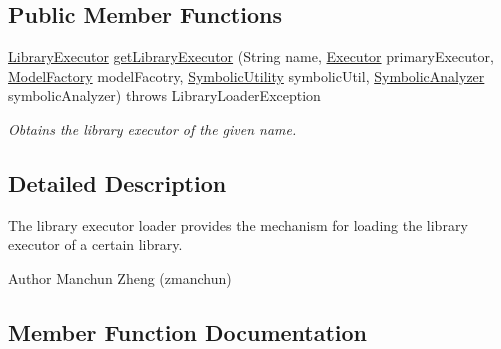 \subsection*{Public Member Functions}
\begin{DoxyCompactItemize}
\item 
\hyperlink{interfaceedu_1_1udel_1_1cis_1_1vsl_1_1civl_1_1semantics_1_1IF_1_1LibraryExecutor}{Library\+Executor} \hyperlink{interfaceedu_1_1udel_1_1cis_1_1vsl_1_1civl_1_1semantics_1_1IF_1_1LibraryExecutorLoader_aab5fd9b48e16c47ce5794b78957786d8}{get\+Library\+Executor} (String name, \hyperlink{interfaceedu_1_1udel_1_1cis_1_1vsl_1_1civl_1_1semantics_1_1IF_1_1Executor}{Executor} primary\+Executor, \hyperlink{interfaceedu_1_1udel_1_1cis_1_1vsl_1_1civl_1_1model_1_1IF_1_1ModelFactory}{Model\+Factory} model\+Facotry, \hyperlink{interfaceedu_1_1udel_1_1cis_1_1vsl_1_1civl_1_1dynamic_1_1IF_1_1SymbolicUtility}{Symbolic\+Utility} symbolic\+Util, \hyperlink{interfaceedu_1_1udel_1_1cis_1_1vsl_1_1civl_1_1semantics_1_1IF_1_1SymbolicAnalyzer}{Symbolic\+Analyzer} symbolic\+Analyzer)  throws Library\+Loader\+Exception
\begin{DoxyCompactList}\small\item\em Obtains the library executor of the given name. \end{DoxyCompactList}\end{DoxyCompactItemize}


\subsection{Detailed Description}
The library executor loader provides the mechanism for loading the library executor of a certain library. 

\begin{DoxyAuthor}{Author}
Manchun Zheng (zmanchun) 
\end{DoxyAuthor}


\subsection{Member Function Documentation}
\hypertarget{interfaceedu_1_1udel_1_1cis_1_1vsl_1_1civl_1_1semantics_1_1IF_1_1LibraryExecutorLoader_aab5fd9b48e16c47ce5794b78957786d8}{}
